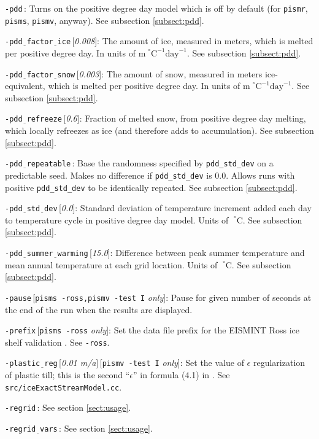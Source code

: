 \documentclass[11pt,final]{amsart}
\renewcommand{\t}[1]{\texttt{#1}}
\newcommand{\eps}{\epsilon}
\newcommand{\rawopt}[1]{\vspace{1mm}\noindent \Large\texttt{-#1}\normalsize}
\newcommand{\opt}[1]{\rawopt{#1}\,:\quad}
\newcommand{\optdef}[2]{\rawopt{#1}\,[\textsl{#2}]:\quad}
\newcommand{\optrestrict}[2]{\rawopt{#1}\,[\texttt{#2} \textsl{only}]:\quad}
\newcommand{\optdefrestrict}[3]{\rawopt{#1}\,[\textsl{#2}]\,[\texttt{#3} \textsl{only}]:\quad}
\newcommand{\und}{$\underline{\,\,\,}$}
\begin{document}
\opt{pdd}  Turns on the positive degree day model which is off by default (for \verb|pismr|, \verb|pisms|, \verb|pismv|, anyway).  See subsection \ref{subsect:pdd}.

\optdef{pdd\und factor\und ice}{0.008}  The amount of ice, measured in meters, which is melted per positive degree day.  In units of $\text{m}\!\phantom{|}^\circ\text{C}^{-1}\text{day}^{-1}$.  See subsection \ref{subsect:pdd}.

\optdef{pdd\und factor\und snow}{0.003}  The amount of snow, measured in meters ice-equivalent, which is melted per positive degree day.  In units of $\text{m}\phantom{|}^\circ\text{C}^{-1}\text{day}^{-1}$.  See subsection \ref{subsect:pdd}.

\optdef{pdd\und refreeze}{0.6}  Fraction of melted snow, from positive degree day melting, which locally refreezes as ice (and therefore adds to accumulation).  See subsection \ref{subsect:pdd}.

\opt{pdd\und repeatable}  Base the randomness specified by \verb|pdd_std_dev| on a predictable seed.  Makes no difference if \verb|pdd_std_dev| is 0.0.  Allows runs with positive \verb|pdd_std_dev| to be identically repeated.  See subsection \ref{subsect:pdd}.

\optdef{pdd\und std\und dev}{0.0}  Standard deviation of temperature increment added each day to temperature cycle in positive degree day model.  Units of $\phantom{|}^\circ\text{C}$.  See subsection \ref{subsect:pdd}.

\optdef{pdd\und summer\und warming}{15.0}  Difference between peak summer temperature and mean annual temperature at each grid location.  Units of $\phantom{|}^\circ\text{C}$.  See subsection \ref{subsect:pdd}.

\optrestrict{pause}{pisms -ross,pismv -test I}    Pause for given number of seconds at the end of the run when the results are displayed.

\optrestrict{prefix}{pisms -ross}    Set the data file prefix for the EISMINT Ross ice shelf validation \cite{MacAyealetal}.  See \verb|-ross|.

\optdefrestrict{plastic\und reg}{0.01 m/a}{pismv -test I}    Set the value of $\eps$ regularization of plastic till; this is the second ``$\eps$'' in formula (4.1) in \cite{SchoofStream}.  See \t{src/iceExactStreamModel.cc}.

\opt{regrid}  See section \ref{sect:usage}.

\opt{regrid\und vars}  See section \ref{sect:usage}.
\end{document}
